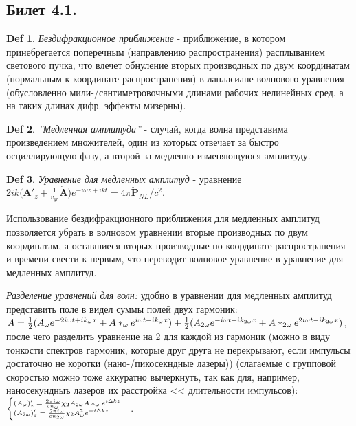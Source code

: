 \documentclass[a4paper,12pt]{article}
\theoremstyle{definition} %
\theoremstyle{definition} %
\newtheorem{Def}{Def}[section]
\theoremstyle{remark} %
\begin{document}
	
\subsection{Билет 4.1.}

\begin{Def}
	\textit{Бездифракционное приближение} - приближение, в котором принебрегается поперечным (направлению распространения) расплыванием светового пучка, что влечет обнуление вторых производных по двум координатам (нормальным к координате распространения) в лапласиане волнового уравнения (обусловленно мили-/сантиметровочными длинами рабочих нелинейных сред, а на таких длинах дифр. эффекты мизерны).
\end{Def}
\begin{Def}
	\textit{''Медленная амплитуда''} - случай, когда волна представима произведением множителей, один из которых отвечает за быстро осциллирующую фазу, а второй за медленно изменяющуюся амплитуду.
\end{Def}
\begin{Def}
	\textit{Уравнение для медленных амплитуд} - уравнение $2ik \big( \mathbf{A}'_{z} + \frac{1}{v_{gr}} \dot{\mathbf{A}} \big) e^{-i\omega z + ikt} = 4\pi \ddot{\mathbf{P}}_{NL}/c^{2}$.
\end{Def}

	Использование бездифракционного приближения для медленных амплитуд позволяется убрать в волновом уравнении вторые производных по двум координатам, а оставшиеся вторых производные по координате распространения и времени свести к первым, что переводит волновое уравнение в уравнение для медленных амплитуд.


	\textit{Разделение уравнений для волн:} удобно в уравнении для медленных амплитуд представить поле в видел суммы полей двух гармоник: $A = \frac{1}{2} (A_{\omega}e^{-2i\omega t +i k_{\omega}x} + A*_{\omega}e^{i\omega t -i k_{\omega}x}) + \\ \frac{1}{2} (A_{2\omega}e^{-i\omega t +i k_{2\omega}x} + A*_{2\omega}e^{2i\omega t -i k_{2\omega}x})$, после чего разделить уравнение на 2 для каждой из гармоник (можно в виду тонкости спектров гармоник, которые друг друга не перекрывают, если импульсы достаточно не коротки (нано-/пикосекндные лазеры)) (слагаемые с групповой скоростью можно тоже аккуратно вычеркнуть, так как для, например, наносекундныъ лазеров их расстройка << длительности импульсов): $\scriptsize
	\begin{cases}
		(A_{\omega})'_{z}=\frac{2\pi i \omega}{cn_{\omega}} \chi_{2} A_{2\omega}A*_{\omega} e^{i \Delta k z} \\
		(A_{2\omega})'_{z}=\frac{2\pi i \omega}{cn_{2\omega}} \chi_{2} A_{\omega}^{2} e^{- i \Delta k z} 
	\end{cases}$.
\end{document}
